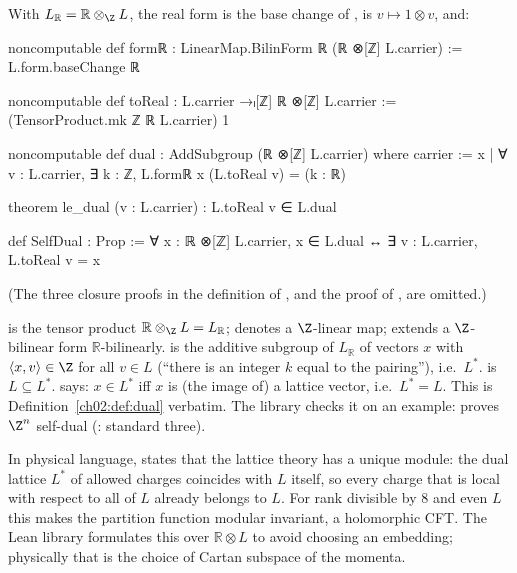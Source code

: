 \begin{definition}\label{ch02:def:voadual}
With $L_{\mathbb{R}}=\mathbb{R}\otimes_{\Z} L$, the real form  is the base change of
,  is $v\mapsto1\otimes v$, and:
\end{definition}
\begin{leancode}
noncomputable def formℝ : LinearMap.BilinForm ℝ (ℝ ⊗[ℤ] L.carrier) := L.form.baseChange ℝ

noncomputable def toReal : L.carrier →ₗ[ℤ] ℝ ⊗[ℤ] L.carrier :=
  (TensorProduct.mk ℤ ℝ L.carrier) 1

noncomputable def dual : AddSubgroup (ℝ ⊗[ℤ] L.carrier) where
  carrier := {x | ∀ v : L.carrier, ∃ k : ℤ, L.formℝ x (L.toReal v) = (k : ℝ)}

theorem le_dual (v : L.carrier) : L.toReal v ∈ L.dual

def SelfDual : Prop := ∀ x : ℝ ⊗[ℤ] L.carrier, x ∈ L.dual ↔ ∃ v : L.carrier, L.toReal v = x
\end{leancode}
(The three closure proofs in the definition of , and the proof of , are
omitted.)
\begin{dictionary}
 is the tensor product $\mathbb{R}\otimes_{\Z} L=L_{\mathbb{R}}$;
 denotes a $\Z$-linear map;  extends a $\Z$-bilinear form
$\mathbb{R}$-bilinearly.   is the additive subgroup of $L_{\mathbb{R}}$ of vectors $x$
with $\langle x,v\rangle\in\Z$ for all $v\in L$ (``there is an integer $k$ equal to the
pairing''), i.e.\ $L^*$.   is $L\subseteq L^*$.   says: $x\in L^*$
iff $x$ is (the image of) a lattice vector, i.e.\ $L^*=L$.  This is Definition~\ref{ch02:def:dual}
verbatim.  The library checks it on an example:  proves $\Z^n$
self-dual (: standard three).
\end{dictionary}
\begin{physics}
In physical language,  states that the lattice theory has a unique module: the dual lattice $L^*$ of allowed charges coincides with $L$ itself, so every charge that is local with respect to all of $L$ already belongs to $L$. For rank divisible by $8$ and even $L$ this makes the partition function modular invariant, a holomorphic CFT. The Lean library formulates this over $\mathbb{R}\otimes L$ to avoid choosing an embedding; physically that is the choice of Cartan subspace of the momenta.
\end{physics}

